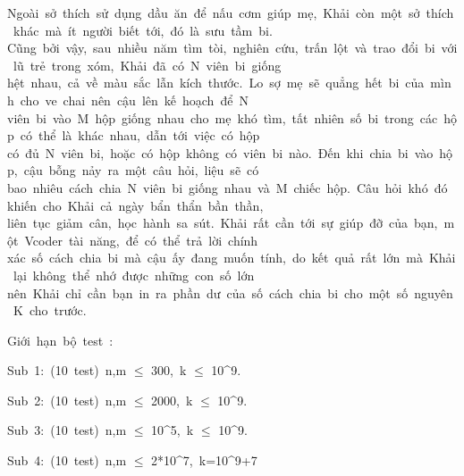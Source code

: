 Ngoài sở thích sử dụng dầu ăn để nấu cơm giúp mẹ, Khải còn một sở thích khác mà ít người biết tới, đó là sưu tầm bi. Cũng bởi vậy, sau nhiều năm tìm tòi, nghiên cứu, trấn lột và trao đổi bi với lũ trẻ trong xóm, Khải đã có N viên bi giống hệt nhau, cả về màu sắc lẫn kích thước. Lo sợ mẹ sẽ quẳng hết bi của mình cho ve chai nên cậu lên kế hoạch để N viên bi vào M hộp giống nhau cho mẹ khó tìm, tất nhiên số bi trong các hộp có thể là khác nhau, dẫn tới việc có hộp có đủ N viên bi, hoặc có hộp không có viên bi nào. Đến khi chia bi vào hộp, cậu bỗng nảy ra một câu hỏi, liệu sẽ có bao nhiêu cách chia N viên bi giống nhau và M chiếc hộp. Câu hỏi khó đó khiến cho Khải cả ngày bẩn thẩn bần thần, liên tục giảm cân, học hành sa sút. Khải rất cần tới sự giúp đỡ của bạn, một Vcoder tài năng, để có thể trả lời chính xác số cách chia bi mà cậu ấy đang muốn tính, do kết quả rất lớn mà Khải lại không thể nhớ được những con số lớn nên Khải chỉ cần bạn in ra phần dư của số cách chia bi cho một số nguyên K cho trước.  



   Giới hạn bộ test :  

   Sub 1: (10 test) n,m $\le$ 300, k $\le$ 10^9.  

   Sub 2: (10 test) n,m $\le$ 2000, k $\le$ 10^9.  

   Sub 3: (10 test) n,m $\le$ 10^5, k $\le$ 10^9.  

   Sub 4: (10 test) n,m $\le$ 2*10^7, k=10^9+7  



\